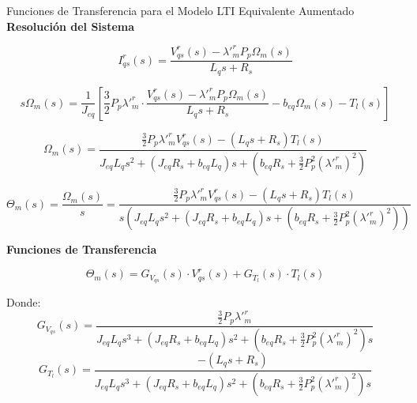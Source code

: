 \documentclass[12pt]{beamer}
\begin{document}
\begin{frame}{\small Funciones de Transferencia para el Modelo LTI Equivalente Aumentado}\scriptsize
    \textbf{Resolución del Sistema}


\[
I^r_{qs}(s) = \frac{V^r_{qs}(s) - \lambda'^r_m P_p \Omega_m(s)}{L_q s + R_s}
\]


\[
s\Omega_m(s) = \frac{1}{J_{eq}} \left[ \frac{3}{2} P_p \lambda'^r_m \cdot \frac{V^r_{qs}(s) - \lambda'^r_m P_p \Omega_m(s)}{L_q s + R_s} - b_{eq} \Omega_m(s) - T_l(s) \right]
\]


\[
\Omega_m(s) = \frac{\frac{3}{2} P_p \lambda'^r_m V^r_{qs}(s) - (L_q s + R_s) T_l(s)}{J_{eq} L_q s^2 + (J_{eq} R_s + b_{eq} L_q) s + \left(b_{eq} R_s + \frac{3}{2} P_p^2 (\lambda'^r_m)^2\right)}
\]


\[
\Theta_m(s) = \frac{\Omega_m(s)}{s} = \frac{\frac{3}{2} P_p \lambda'^r_m V^r_{qs}(s) - (L_q s + R_s) T_l(s)}{s \left( J_{eq} L_q s^2 + (J_{eq} R_s + b_{eq} L_q) s + \left(b_{eq} R_s + \frac{3}{2} P_p^2 (\lambda'^r_m)^2 \right) \right)}
\]

\textbf{Funciones de Transferencia}

\[
\Theta_m(s) = G_{V_{qs}}(s) \cdot V^r_{qs}(s) + G_{T_l}(s) \cdot T_l(s)
\]

Donde:
\begin{equation}
G_{V_{qs}}(s) = \frac{\frac{3}{2} P_p \lambda'^r_m}{J_{eq} L_q s^3 + (J_{eq} R_s + b_{eq} L_q) s^2 + \left(b_{eq} R_s + \frac{3}{2} P_p^2 (\lambda'^r_m)^2\right) s}
\end{equation}
\begin{equation}
G_{T_l}(s) = \frac{-(L_q s + R_s)}{J_{eq} L_q s^3 + (J_{eq} R_s + b_{eq} L_q) s^2 + \left(b_{eq} R_s + \frac{3}{2} P_p^2 (\lambda'^r_m)^2\right) s}
\end{equation}
\end{frame}
\end{document}
